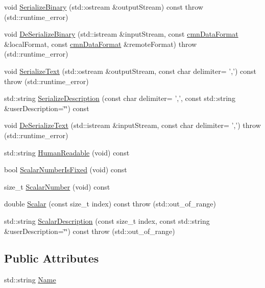\begin{DoxyCompactItemize}
\item 
void \hyperlink{classmts_command_void_description_a8f73300d3cf20874f119d4bc1ed77c1d}{Serialize\-Binary} (std\-::ostream \&output\-Stream) const   throw (std\-::runtime\-\_\-error)
\item 
void \hyperlink{classmts_command_void_description_a3fda3e49e9aca60ff86a89316701722f}{De\-Serialize\-Binary} (std\-::istream \&input\-Stream, const \hyperlink{classcmn_data_format}{cmn\-Data\-Format} \&local\-Format, const \hyperlink{classcmn_data_format}{cmn\-Data\-Format} \&remote\-Format)  throw (std\-::runtime\-\_\-error)
\item 
void \hyperlink{classmts_command_void_description_acef3373c62959147d26f92e431a0db8e}{Serialize\-Text} (std\-::ostream \&output\-Stream, const char delimiter= ',') const   throw (std\-::runtime\-\_\-error)
\item 
std\-::string \hyperlink{classmts_command_void_description_ae5839801fbc029a642fc64bee882238f}{Serialize\-Description} (const char delimiter= ',', const std\-::string \&user\-Description=\char`\"{}\char`\"{}) const 
\item 
void \hyperlink{classmts_command_void_description_aeac80ef19c065841ac86310552ae1be4}{De\-Serialize\-Text} (std\-::istream \&input\-Stream, const char delimiter= ',')  throw (std\-::runtime\-\_\-error)
\item 
std\-::string \hyperlink{classmts_command_void_description_aee2a31ecb64a5e23e35e834145ff71f5}{Human\-Readable} (void) const 
\item 
bool \hyperlink{classmts_command_void_description_ad8e2201e0bd5af0e35f3bd64af0a6eb1}{Scalar\-Number\-Is\-Fixed} (void) const 
\item 
size\-\_\-t \hyperlink{classmts_command_void_description_aec84c76fd1522e65e4a55cf42ab9c86a}{Scalar\-Number} (void) const 
\item 
double \hyperlink{classmts_command_void_description_ae11ab50af5d388dac88f95557fe286a5}{Scalar} (const size\-\_\-t index) const   throw (std\-::out\-\_\-of\-\_\-range)
\item 
std\-::string \hyperlink{classmts_command_void_description_a89a603cca8292cc94ec93a9dadf0f528}{Scalar\-Description} (const size\-\_\-t index, const std\-::string \&user\-Description=\char`\"{}\char`\"{}) const   throw (std\-::out\-\_\-of\-\_\-range)
\end{DoxyCompactItemize}
\subsection*{Public Attributes}
\begin{DoxyCompactItemize}
\item 
std\-::string \hyperlink{classmts_command_void_description_a03b004586fef73637e80f22f3dbbf8f6}{Name}
\end{DoxyCompactItemize}


